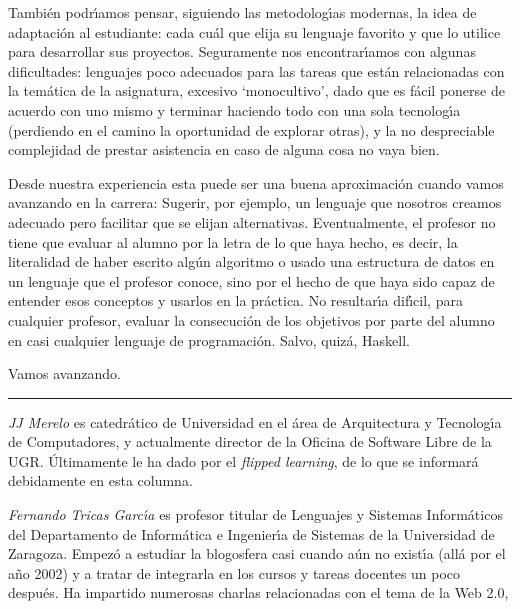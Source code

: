 \documentclass[twoside,10pt]{article}
\newcounter{num}
\begin{document}
\begin{multicols}{2}
Tambi\'en podr\'{\i}amos pensar, siguiendo las metodolog\'{\i}as modernas, la idea de
adaptaci\'on al estudiante: cada cu\'al que elija su lenguaje favorito y que lo
utilice
para desarrollar sus proyectos. Seguramente nos encontrar\'{\i}amos con algunas
dificultades: lenguajes poco adecuados para las tareas que est\'an
relacionadas con la tem\'atica de la asignatura, excesivo `monocultivo',
dado que es f\'acil ponerse de acuerdo con uno mismo y terminar haciendo todo
con una sola tecnolog\'{\i}a (perdiendo en el camino la oportunidad de
explorar otras), y la
no despreciable complejidad de prestar asistencia en caso de alguna cosa no
vaya bien. 

Desde nuestra experiencia esta puede ser una buena aproximaci\'on cuando
vamos avanzando en la carrera: Sugerir, por ejemplo, un lenguaje que
nosotros creamos adecuado pero facilitar que se elijan alternativas.
Eventualmente, el profesor no tiene que evaluar al
alumno por la letra de lo que haya hecho, es decir, la literalidad de
haber escrito alg\'un algoritmo o usado una estructura de datos en un
lenguaje que el profesor conoce, sino por el hecho de que haya sido
capaz de entender esos conceptos y usarlos en la pr\'actica. No
resultar\'{\i}a dif\'{\i}cil, para cualquier profesor, evaluar la consecuci\'on de
los objetivos por parte del alumno en casi cualquier lenguaje de
programaci\'on. Salvo, quiz\'a, Haskell.

Vamos avanzando.


\noindent\rule{86mm}{1pt}
\vspace{1ex} {\small{\begin{window} 
\noindent\emph{JJ Merelo} es catedr\'{a}tico de Universidad
en el \'area de Arquitectura y Tecnolog\'{\i}a de Computadores, y
actualmente director de la Oficina de Software Libre de la UGR.
\'{U}ltimamente le ha dado por el \textsl{flipped
learning}, de lo que se informar\'{a} debidamente en esta columna.
\end{window}}} 
\medskip

{\small{\begin{window}
		\noindent \emph{Fernando Tricas Garc\'{\i}a} es profesor
		titular de Lenguajes y Sistemas Inform\'{a}ticos del Departamento
		de Inform\'{a}tica e Ingenier\'{\i}a de Sistemas de la Universidad de
		Zaragoza.  Empez\'{o} a estudiar la blogosfera casi cuando a\'{u}n no
		exist\'{\i}a (all\'{a} por el a\~{n}o 2002) y a tratar de integrarla en los
		cursos y tareas docentes un poco despu\'{e}s.  Ha impartido
		numerosas charlas relacionadas con el tema de la Web 2.0, 


\end{window}}}
\end{multicols}
\end{document}

